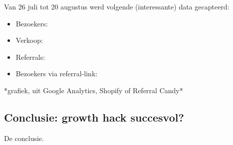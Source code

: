 Van 26 juli tot 20 augustus werd volgende (interessante) data gecapteerd:

\begin{itemize}
	\item Bezoekers:
	\item Verkoop:
	\item Referrals:
	\item Bezoekers via referral-link:
\end{itemize}

*grafiek, uit Google Analytics, Shopify of Referral Candy*


\subsection{Conclusie: growth hack succesvol?} \label{sec:conclusie-growth-hack-succesvol}
De conclusie.
